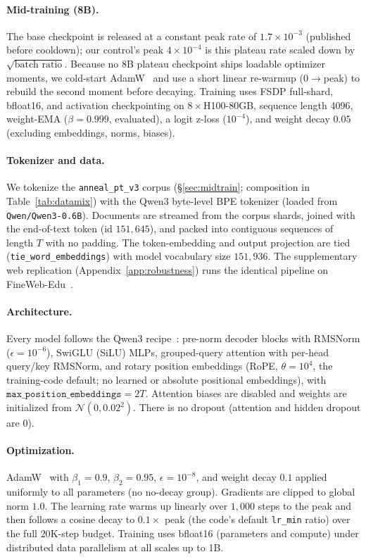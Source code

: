 \documentclass{article}
\begin{document}
\paragraph{Mid-training (8B).} The base checkpoint is released at a constant
peak rate of $1.7\times10^{-3}$ (published before cooldown); our control's peak
$4\times10^{-4}$ is this plateau rate scaled down by
$\sqrt{\text{batch ratio}}$. Because no 8B plateau checkpoint ships loadable
optimizer moments, we cold-start AdamW~\citep{loshchilov2019adamw} and use a
short linear re-warmup ($0\rightarrow$peak) to rebuild the second moment before
decaying. Training uses FSDP full-shard, bfloat16, and activation checkpointing
on $8\times$H100-80GB, sequence length 4096, weight-EMA ($\beta{=}0.999$,
evaluated), a logit z-loss ($10^{-4}$), and weight decay $0.05$ (excluding
embeddings, norms, biases).

\paragraph{Tokenizer and data.} We tokenize the \texttt{anneal\_pt\_v3} corpus
(\S\ref{sec:midtrain}; composition in Table~\ref{tab:datamix}) with the Qwen3
byte-level BPE tokenizer (loaded from \texttt{Qwen/Qwen3-0.6B}). Documents are
streamed from the corpus shards, joined with the end-of-text token (id
$151{,}645$), and
packed into contiguous sequences of length $T$ with no padding. The token-embedding
and output projection are tied (\texttt{tie\_word\_embeddings}) with model vocabulary
size $151{,}936$. The supplementary web replication
(Appendix~\ref{app:robustness}) runs the identical pipeline on
FineWeb-Edu~\citep{penedo2024fineweb}.

\paragraph{Architecture.} Every model follows the Qwen3 recipe~\citep{qwen2025qwen3}:
pre-norm decoder blocks with RMSNorm ($\epsilon{=}10^{-6}$), SwiGLU (SiLU) MLPs,
grouped-query attention with per-head query/key RMSNorm, and rotary position
embeddings (RoPE, $\theta{=}10^{4}$, the training-code default; no learned or absolute
positional embeddings), with $\texttt{max\_position\_embeddings}{=}2T$. Attention
biases are disabled and weights are initialized from $\mathcal{N}(0,0.02^{2})$. There
is no dropout (attention and hidden dropout are $0$).

\paragraph{Optimization.} AdamW~\citep{loshchilov2019adamw} with $\beta_1{=}0.9$,
$\beta_2{=}0.95$, $\epsilon{=}10^{-8}$, and weight decay $0.1$ applied uniformly to
all parameters (no no-decay group). Gradients are clipped to global norm $1.0$. The
learning rate warms up linearly over $1{,}000$ steps to the peak and then follows a
cosine decay to $0.1\times$ peak (the code's default \texttt{lr\_min} ratio) over the
full $20$K-step budget. Training uses bfloat16 (parameters and compute) under
distributed data parallelism at all scales up to 1B.
\end{document}
